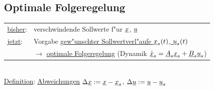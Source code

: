 \documentclass[openany,a4paper,11pt]{book}
\begin{document}
\subsection{Optimale Folgeregelung}
\begin{tabular}{ll}
    \uline{bisher}:& verschwindende Sollwerte f"ur $\uline{x}$, $\uline{u}$\\
    \uline{jetzt}: & Vorgabe \uline{gew"unschter Sollwertverl"aufe $\uline{x}_s(t)$, $\uline{u}_s(t)$}\\
    & $\rightarrow$ \uline{optimale Folgeregelung} \quad (Dynamik $\uline{\dot{x}}_s=\uline{A}_s\uline{x}_s+\uline{B}_s\uline{u}_s$)
\end{tabular}\\
\uline{Definition}: \uline{Abweichungen} $\Delta\uline{x}:=\uline{x}-\uline{x}_s$, $\Delta\uline{u}:=\uline{u}-\uline{u}_s$
\end{document}
